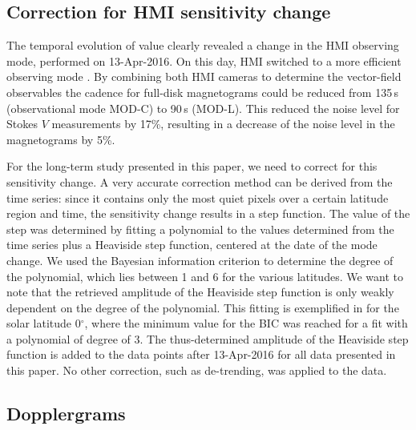\documentclass{aa}
\begin{document}
\subsection{Correction for HMI sensitivity change\label{sensicorr}}

The temporal evolution of \inw{} \brms{} value
clearly revealed  a change in the HMI observing mode, performed on 13-Apr-2016. On this day, HMI switched to a more efficient observing mode \cite[see][]{2018SoPh..293...45H,2014SoPh..289.3483H,2016SoPh..291.1887C}. By combining both HMI cameras to determine the vector-field observables the cadence for full-disk magnetograms could be reduced from 135\,s (observational mode MOD-C) to 90\,s (MOD-L). This reduced the noise level for Stokes $V$ measurements by 17\%, resulting in a decrease of the noise level in the \los{} magnetograms by 5\%.

For the long-term study presented in this paper, we need to correct for this sensitivity change. A very accurate correction method can be derived from the \inw{} time series: since it contains only the most quiet pixels over a certain latitude region and time, the sensitivity change results in a step function. The value of the step was determined by fitting a polynomial to the \brms{} values determined from the \inw{} time series plus a Heaviside step function, centered at the date of the mode change. We used the Bayesian information criterion \cite[BIC,][]{Stoica2004} to determine the degree of the polynomial, which lies between 1 and 6 for the various latitudes. We want to note that the retrieved amplitude of the Heaviside step function is only weakly dependent on the degree of the polynomial. This fitting is exemplified in  for the solar latitude 0$^\circ$, where the minimum value for the BIC was reached for a fit with a polynomial of 
degree of 3. 
The thus-determined amplitude of the Heaviside step function is added to the 
\brms{}
data points after 13-Apr-2016 for all data presented in this paper. No other correction, such as de-trending, was applied to the data.


\subsection{Dopplergrams}
\end{document}
